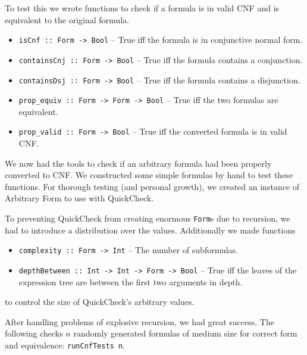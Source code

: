 \documentclass[11pt,a4paper]{article}
\numberwithin{equation}{section}%
\begin{document}
To test this we wrote functions to check if a formula is in valid CNF and is equivalent to the original formula.
\begin{itemize}
    \item \texttt{isCnf :: Form -> Bool} \--- True iff the formula is in conjunctive normal form.
    \item \texttt{containsCnj :: Form -> Bool} \--- True iff the formula contains a conjunction.
    \item \texttt{containsDsj :: Form -> Bool} \--- True iff the formula contains a disjunction.
    \item \texttt{prop\_equiv :: Form -> Form -> Bool} \--- True iff the two formulas are equivalent.
    \item \texttt{prop\_valid :: Form -> Bool} \--- True iff the converted formula is in valid CNF.
\end{itemize}

We now had the tools to check if an arbitrary formula had been properly converted to CNF. We constructed some simple formulas by hand to test these functions. For thorough testing (and personal growth), we created an instance of Arbitrary Form to use with QuickCheck. 

To preventing QuickCheck from creating enormous \texttt{Form}s due to recursion, we had to introduce a distribution over the values. Additionally we made functions
\begin{itemize}
    \item \texttt{complexity :: Form -> Int} \--- The number of subformulas.
    \item \texttt{depthBetween :: Int -> Int -> Form -> Bool} \--- True iff the leaves of the expression tree are between the first two arguments in depth.
\end{itemize}
to control the size of QuickCheck's arbitrary values.

After handling problems of explosive recursion, we had great success. The following checks $n$ randomly generated formulas of medium size for correct form and equivalence: \texttt{runCnfTests n}.
\end{document}
